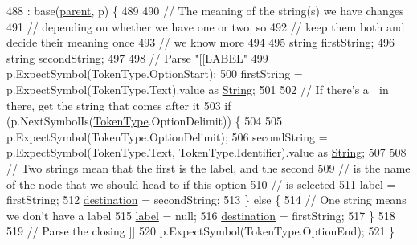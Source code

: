 \begin{DoxyCode}
488                                                                  : base(\hyperlink{a00142_af313a82103fcc2ff5a177dbb06b92f7b}{parent}, p) \{
489 
490                 \textcolor{comment}{// The meaning of the string(s) we have changes}
491                 \textcolor{comment}{// depending on whether we have one or two, so}
492                 \textcolor{comment}{// keep them both and decide their meaning once}
493                 \textcolor{comment}{// we know more}
494 
495                 \textcolor{keywordtype}{string} firstString;
496                 \textcolor{keywordtype}{string} secondString;
497 
498                 \textcolor{comment}{// Parse "[[LABEL"}
499                 p.ExpectSymbol(TokenType.OptionStart);
500                 firstString = p.ExpectSymbol(TokenType.Text).value as \hyperlink{a00045_a301aa7c866593a5b625a8fc158bbeacea27118326006d3829667a400ad23d5d98}{String};
501 
502                 \textcolor{comment}{// If there's a | in there, get the string that comes after it}
503                 \textcolor{keywordflow}{if} (p.NextSymbolIs(\hyperlink{a00045_a301aa7c866593a5b625a8fc158bbeace}{TokenType}.OptionDelimit)) \{
504 
505                     p.ExpectSymbol(TokenType.OptionDelimit);
506                     secondString = p.ExpectSymbol(TokenType.Text, TokenType.Identifier).value as 
      \hyperlink{a00045_a301aa7c866593a5b625a8fc158bbeacea27118326006d3829667a400ad23d5d98}{String};
507 
508                     \textcolor{comment}{// Two strings mean that the first is the label, and the second}
509                     \textcolor{comment}{// is the name of the node that we should head to if this option}
510                     \textcolor{comment}{// is selected}
511                     \hyperlink{a00140_a7f27d78e67fed6992767e995e70fc468}{label} = firstString;
512                     \hyperlink{a00140_abbe56fba06169901508e6c659f06c236}{destination} = secondString;
513                 \} \textcolor{keywordflow}{else} \{
514                     \textcolor{comment}{// One string means we don't have a label}
515                     \hyperlink{a00140_a7f27d78e67fed6992767e995e70fc468}{label} = null;
516                     \hyperlink{a00140_abbe56fba06169901508e6c659f06c236}{destination} = firstString;
517                 \}
518 
519                 \textcolor{comment}{// Parse the closing ]]}
520                 p.ExpectSymbol(TokenType.OptionEnd);
521             \}
\end{DoxyCode}


